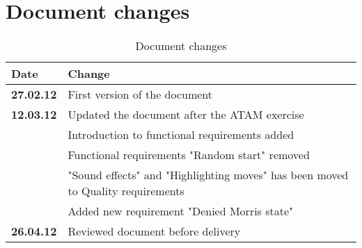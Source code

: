 \newpage

\section{Document changes}

\begin{table}[h!]
\begin{tabular}{ | p{90pt} | p{270pt}  |}
\hline
\bf Date & \bf Change \\ \hline
\bf 27.02.12  &  First version of the document  \\ \hline
\bf 12.03.12 & Updated the document after the ATAM exercise \\ 
& Introduction to functional requirements added \\
& Functional requirements "Random start" removed \\ 
& "Sound effects" and "Highlighting moves" has been moved to Quality requirements \\
& Added new requirement "Denied Morris state" \\ \hline
\bf 26.04.12 & Reviewed document before delivery \\ \hline 

\end{tabular}
\caption{Document changes}
\end{table}
